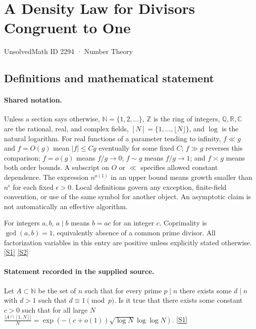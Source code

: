 \documentclass[11pt,a4paper]{article}
\newcommand{\N}{\mathbb{N}}
\newcommand{\Z}{\mathbb{Z}}
\newcommand{\Q}{\mathbb{Q}}
\newcommand{\R}{\mathbb{R}}
\newcommand{\C}{\mathbb{C}}
\newcommand{\sref}[2]{\hyperlink{source:#1:#2}{[S#2]}}
\begin{document}

\setcounter{section}{2293}

\section{A Density Law for Divisors Congruent to One}\label{2294}

{\small\sffamily UnsolvedMath ID 2294 · Number Theory}

\subsection{Definitions and mathematical statement}

\paragraph{Shared notation.}Unless a section says otherwise, $\N=\{1,2,\ldots\}$,
$\Z$ is the ring of integers, $\Q,\R,\C$ are the rational, real, and complex
fields, $[N]=\{1,\ldots,\lfloor N\rfloor\}$, and $\log$ is the natural
logarithm. For real functions of a parameter tending to infinity,
$f\ll g$ and $f=O(g)$ mean $|f|\leq Cg$ eventually for some fixed $C$;
$f\gg g$ reverses this comparison; $f=o(g)$ means $f/g\to0$;
$f\sim g$ means $f/g\to1$; and $f\asymp g$ means both order bounds.
A subscript on $O$ or $\ll$ specifies allowed constant dependence.
The expression $n^{o(1)}$ in an upper bound means growth smaller than
$n^\epsilon$ for each fixed $\epsilon>0$. Local definitions govern any
exception, finite-field convention, or use of the same symbol for another
object. An asymptotic claim is not automatically an effective algorithm.



For integers $a,b$, $a\mid b$ means $b=ac$ for an integer $c$. Coprimality is $\gcd(a,b)=1$, equivalently absence of a common prime divisor. All factorization variables in this entry are positive unless explicitly stated otherwise. \sref{2294}{1} \sref{2294}{2}

\paragraph{Statement recorded in the supplied source.}
Let $A\subset\mathbb{N}$ be the set of $n$ such that for every prime $p\mid n$ there exists some $d\mid n$ with $d>1$ such that $d\equiv 1\pmod{p}$. Is it true that there exists some constant $c>0$ such that for all large $N$ $ \frac{\lvert A\cap [1,N]\rvert}{N}=\exp(-(c+o(1))\sqrt{\log N}\log\log N). $ \sref{2294}{1}
\end{document}
